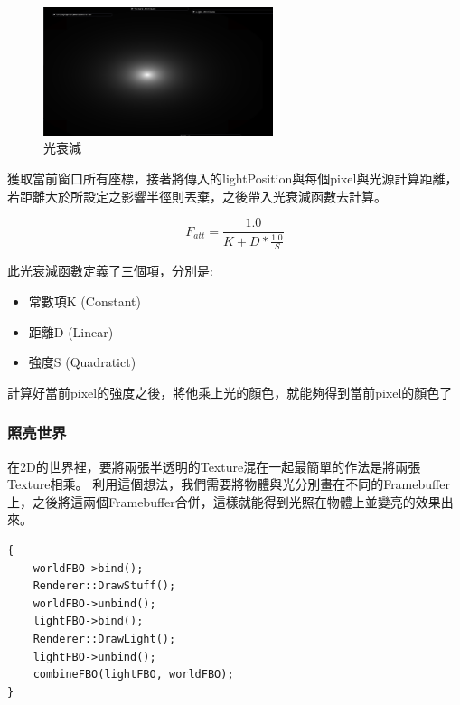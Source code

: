 \begin{figure}[h]
    \begin{center}
    \includegraphics[width=0.6\textwidth]{./resources/2D-Lighting/attenuation.png}
    \end{center}
\caption{光衰減}
\label{fig:attenuation}
\end{figure}

\newpage
獲取當前窗口所有座標，接著將傳入的lightPosition與每個pixel與光源計算距離，若距離大於所設定之影響半徑則丟棄，之後帶入光衰減函數去計算。

\begin{equation} F_{att} = \frac{1.0}{K + D * \frac{1.0}{S}} \end{equation}

此光衰減函數定義了三個項，分別是:

\begin{itemize}
\item{常數項K (Constant)}
\item{距離D (Linear)}
\item{強度S (Quadratict)}
\end{itemize}

計算好當前pixel的強度之後，將他乘上光的顏色，就能夠得到當前pixel的顏色了

\subsubsection{照亮世界}

在2D的世界裡，要將兩張半透明的Texture混在一起最簡單的作法是將兩張Texture相乘。
利用這個想法，我們需要將物體與光分別畫在不同的Framebuffer上，之後將這兩個Framebuffer合併，這樣就能得到光照在物體上並變亮的效果出來。

\begin{lstlisting}
{
    worldFBO->bind();
    Renderer::DrawStuff();
    worldFBO->unbind();
    lightFBO->bind();
    Renderer::DrawLight();
    lightFBO->unbind();
    combineFBO(lightFBO, worldFBO);
}
\end{lstlisting}

